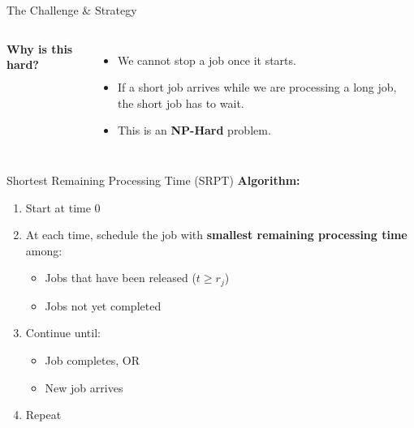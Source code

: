 \documentclass[aspectratio=169, 12pt]{beamer}
\begin{document}
\begin{frame}{The Challenge \& Strategy}
    \begin{columns}
        \textbf{Why is this hard?}
        \begin{itemize}
            \item<1-> We cannot stop a job once it starts.
            \item<2-> If a short job arrives while we are processing a long job, the short job has to wait.
            \item<3-> This is an \textbf{NP-Hard} problem.
        \end{itemize}
        
    \end{columns}
\end{frame}

\begin{frame}{Shortest Remaining Processing Time (SRPT)}
    \textbf{Algorithm:}
    \begin{enumerate}
        \item Start at time 0
        \item At each time, schedule the job with \textbf{smallest remaining processing time} among:
        \begin{itemize}
            \item Jobs that have been released ($t \geq r_j$)
            \item Jobs not yet completed
        \end{itemize}
        \item Continue until:
        \begin{itemize}
            \item Job completes, OR
            \item New job arrives
        \end{itemize}
        \item Repeat
    \end{enumerate}

    \vspace{0.3cm}
\end{frame}
\end{document}
